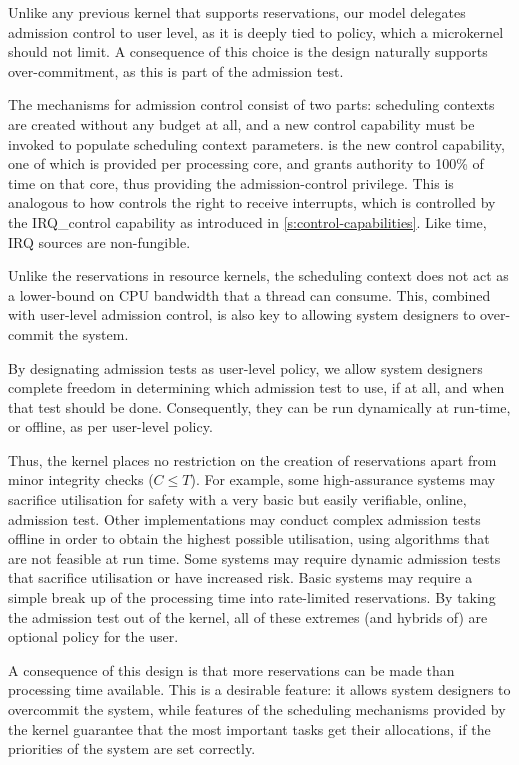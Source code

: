 Unlike any previous kernel that supports reservations, our model delegates admission control to user
level, as it is deeply tied to policy, which a microkernel should not limit. A consequence of this
choice is the design naturally supports over-commitment, as this is part of the admission test.

The mechanisms for admission control consist of two parts: scheduling contexts are created without
any budget at all, and a new control capability must be invoked to populate scheduling context
parameters.
\schedcontrol is the new control capability, one of which is provided per processing core,
and grants authority to 100\% of time on that core, thus providing the admission-control privilege.
This is analogous to how \selfour controls the right
to receive interrupts, which is controlled by the IRQ\_control
capability as introduced in \cref{s:control-capabilities}. Like time, IRQ sources are non-fungible.

Unlike the reservations in resource kernels, the scheduling context does not 
act as a lower-bound on CPU bandwidth that a thread can consume. This, combined with
user-level admission control, is also key to allowing system designers to over-commit the system. 

By designating admission tests as user-level policy, we allow system designers complete freedom
in determining which admission test to use, if at all, and when that test should be done.
Consequently, they can be run dynamically at run-time, or offline, as per user-level policy.

Thus, the kernel places no restriction on the creation of reservations apart from minor integrity
checks (\ie $C \leq T$).
For example, some high-assurance systems may sacrifice utilisation for safety with a very basic but easily verifiable, online, admission test.
Other implementations may conduct complex admission tests offline in order to obtain the highest possible utilisation, using algorithms that are not feasible at run time.
Some systems may require dynamic admission tests that sacrifice utilisation or have increased risk.
Basic systems may require a simple break up of the processing time into rate-limited reservations.
By taking the admission test out of the kernel, all of these extremes (and hybrids of) are optional policy for the user.

A consequence of this design is that more reservations can be made than processing time available.
This is a desirable feature: it allows system designers to overcommit the system, while features of the scheduling mechanisms provided by the kernel guarantee that the most important tasks get their allocations, if the priorities of the system are set correctly.

